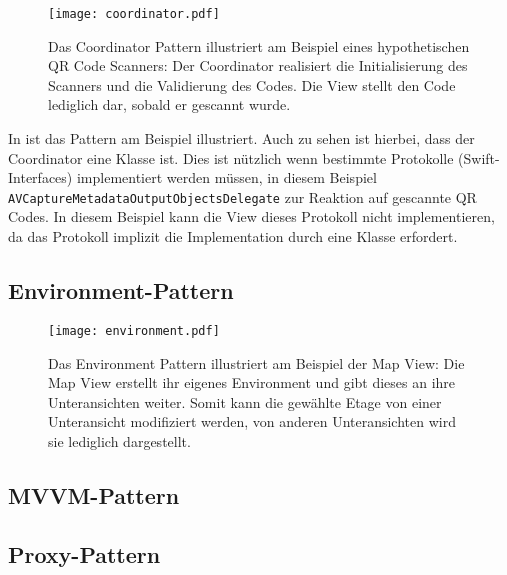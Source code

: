\begin{figure}[H]
\texttt{[image: coordinator.pdf]}
\caption{Das Coordinator Pattern illustriert am Beispiel eines hypothetischen QR Code Scanners: Der Coordinator realisiert die Initialisierung des Scanners und die Validierung des Codes. Die View stellt den Code lediglich dar, sobald er gescannt wurde.}\label{fig:coordinator}
\end{figure}

In  ist das Pattern am Beispiel illustriert. Auch zu sehen ist hierbei, dass der Coordinator eine Klasse ist. Dies ist nützlich wenn bestimmte Protokolle (Swift-Interfaces) implementiert werden müssen, in diesem Beispiel \texttt{AVCaptureMetadataOutputObjectsDelegate} zur Reaktion auf gescannte QR Codes. In diesem Beispiel kann die View dieses Protokoll nicht implementieren, da das Protokoll implizit die Implementation durch eine Klasse erfordert.

\subsection{Environment-Pattern}

\begin{figure}[H]
\texttt{[image: environment.pdf]}
\caption{Das Environment Pattern illustriert am Beispiel der Map View: Die Map View erstellt ihr eigenes Environment und gibt dieses an ihre Unteransichten weiter. Somit kann die gewählte Etage von einer Unteransicht modifiziert werden, von anderen Unteransichten wird sie lediglich dargestellt.}\label{fig:coordinator}
\end{figure}

\subsection{MVVM-Pattern}

\subsection{Proxy-Pattern}

